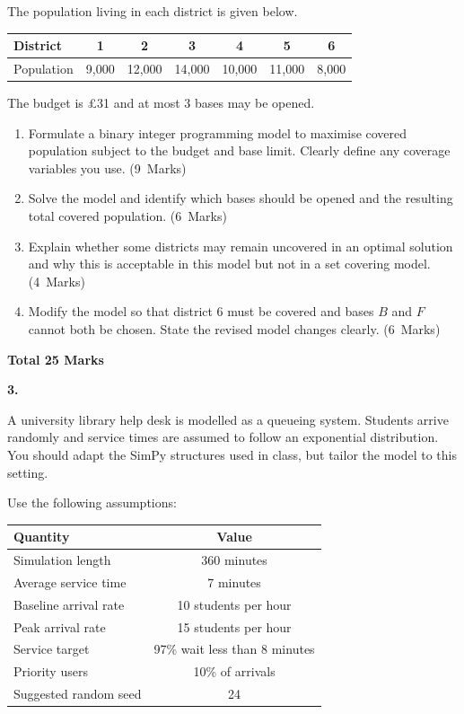 \documentclass[11pt,a4paper]{article}
\newcommand{\markalloc}[1]{\nobreak\hfill\mbox{(#1 Marks)}}
\newcommand{\questiontotal}[1]{\begin{flushright}\textbf{Total #1 Marks}\end{flushright}}
\begin{document}
The population living in each district is given below.

\begin{center}
\begin{tabular}{lcccccc}
\toprule
District & 1 & 2 & 3 & 4 & 5 & 6 \\
\midrule
Population & 9{,}000 & 12{,}000 & 14{,}000 & 10{,}000 & 11{,}000 & 8{,}000 \\
\bottomrule
\end{tabular}
\end{center}

The budget is \pounds31 and at most 3 bases may be opened.

\begin{enumerate}
\item Formulate a binary integer programming model to maximise covered population subject to the budget and base limit. Clearly define any coverage variables you use. \markalloc{9}

\item Solve the model and identify which bases should be opened and the resulting total covered population. \markalloc{6}

\item Explain whether some districts may remain uncovered in an optimal solution and why this is acceptable in this model but not in a set covering model. \markalloc{4}

\item Modify the model so that district 6 must be covered and bases $B$ and $F$ cannot both be chosen. State the revised model changes clearly. \markalloc{6}
\end{enumerate}

\questiontotal{25}

\newpage

\textbf{3.}

A university library help desk is modelled as a queueing system.
Students arrive randomly and service times are assumed to follow an exponential distribution.
You should adapt the SimPy structures used in class, but tailor the model to this setting.

Use the following assumptions:

\begin{center}
\begin{tabular}{lc}
\toprule
Quantity & Value \\
\midrule
Simulation length & 360 minutes \\
Average service time & 7 minutes \\
Baseline arrival rate & 10 students per hour \\
Peak arrival rate & 15 students per hour \\
Service target & 97\% wait less than 8 minutes \\
Priority users & 10\% of arrivals \\
Suggested random seed & 24 \\
\bottomrule
\end{tabular}
\end{center}
\end{document}
